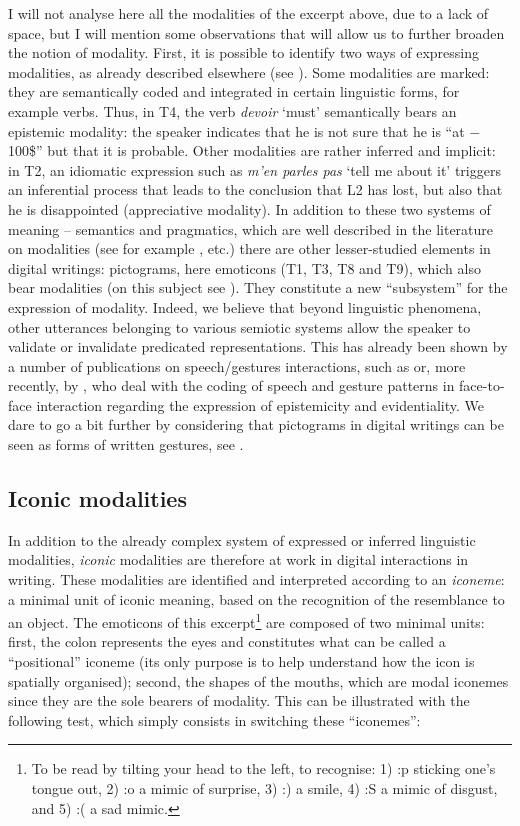 \documentclass[output=paper]{langscibook}
\begin{document}
\z 

I will not analyse here all the modalities of the excerpt above, due to a lack of space, but I will mention some observations that will allow us to further broaden the notion of modality. First, it is possible to identify two ways of expressing modalities, as already described elsewhere (see \citealt{Gosselin2010}). Some modalities are marked: they are semantically coded and integrated in certain linguistic forms, for example verbs. Thus, in T4, the verb \textit{devoir} ‘must’ semantically bears an epistemic modality: the speaker indicates that he is not sure that he is “at $-$100\$” but that it is probable. Other modalities are rather inferred and implicit: in T2, an idiomatic expression such as \textit{m'en parles pas} ‘tell me about it’ triggers an inferential process that leads to the conclusion that L2 has lost, but also that he is disappointed (appreciative modality). In addition to these two systems of meaning -- semantics and pragmatics, which are well described in the literature on modalities (see for example \citealt{Portner2009,Gosselin2010}, etc.) there are other lesser-studied elements in digital writings: pictograms, here emoticons (T1, T3, T8 and T9), which also bear modalities (on this subject see \citealt{Halté2018,Halté2019}). They constitute a new “subsystem” for the expression of modality. Indeed, we believe that beyond linguistic phenomena, other utterances belonging to various semiotic systems allow the speaker to validate or invalidate predicated representations. This has already been shown by a number of publications on speech/gestures interactions, such as \citet{McNeill2005} or, more recently, by \citet{RoseanoEtAl2016}, who deal with the coding of speech and gesture patterns in face-to-face interaction regarding the expression of epistemicity and evidentiality. We dare to go a bit further by considering that pictograms in digital writings can be seen as forms of written gestures, see \citet{Halte2019gestes}.

\subsection{Iconic modalities} 

In addition to the already complex system of expressed or inferred linguistic modalities, \textit{iconic} modalities are therefore at work in digital interactions in writing. These modalities are identified and interpreted according to an \textit{iconeme}: a minimal unit of iconic meaning, based on the recognition of the resemblance to an object. The emoticons of this excerpt\footnote{To be read by tilting your head to the left, to recognise: 1) :p sticking one’s tongue out, 2) :o a mimic of surprise, 3) :) a smile, 4) :S a mimic of disgust, and 5) :( a sad mimic.} are composed of two minimal units: first, the colon represents the eyes and constitutes what can be called a “positional” iconeme (its only purpose is to help understand how the icon is spatially organised); second, the shapes of the mouths, which are modal iconemes since they are the sole bearers of modality. This can be illustrated with the following test, which simply consists in switching these “iconemes”: 
\end{document}
